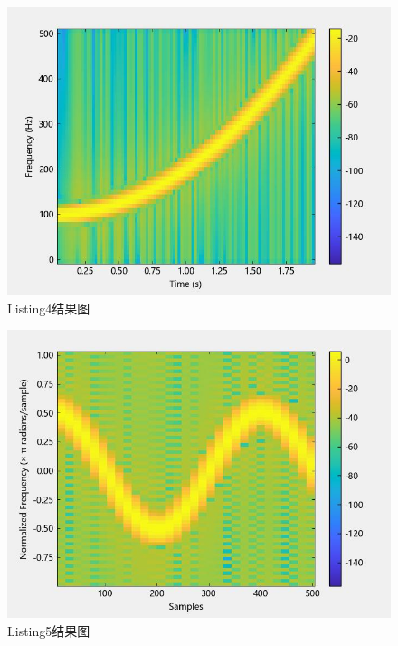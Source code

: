\documentclass{article}
\begin{document}
	
	\begin{figure}[htbp]
		\centering
		\includegraphics{hw5(4).jpeg}
		\caption{Listing4结果图}
		\label{fig4}
	\end{figure}
	
	\begin{figure}[htbp]
		\centering
		\includegraphics{hw5(5).jpeg}
		\caption{Listing5结果图}
		\label{fig5}
	\end{figure}
	
\end{document}
